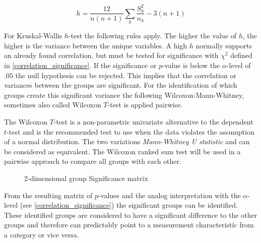 \smallskip
\begin{equation}
\label{formula_kruskal_wallis}	
	h = \frac{12}{n(n+1)}\sum_{h}{\frac{S_h^2}{n_h}}-3(n+1)
\end{equation}

\medskip

For Kruskal-Wallis $h$-test the following rules apply. The higher the value of $h$, the higher is the variance between the unique variables. A high $h$ normally supports an already found correlation, but must be tested for significance with $\chi^2$ defined in \cref{correlation_significance}. If the significance or $p$-value is below the $\alpha$-level of $.05$ the null hypothesis can be rejected. This implies that the correlation or variances between the groups are significant. For the identification of which groups create this significant variance the following Wilcoxon-Mann-Whitney, sometimes also called Wilcoxon $T$-test is applied pairwise.

The Wilcoxon $T$-test is a non-parametric univariate alternative to the dependent $t$-test and is the recommended test to use when the data violates the assumption of a normal distribution. The two variations \textit{Mann-Whitney U statistic} and  can be considered as equivalent. The Wilcoxon ranked sum test will be used in a pairwise approach to compare all groups with each other. 
\begin{figure}[ht]
	\centering
  	\caption{2-dimensional group Significance matrix}
\end{figure}
From the resulting matrix of $p$-values and the analog interpretation with the $\alpha$-level (see \cref{correlation_significance}) the significant groups can be identified. These identified groups are considered to have a significant difference to the other groups and therefore can predictably point to a measurement characteristic from a category or vice versa.

